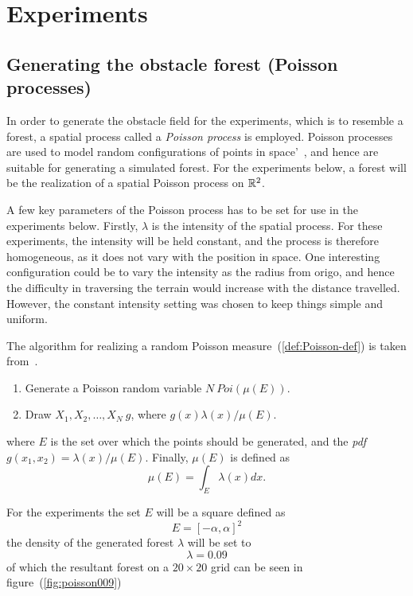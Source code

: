 \chapter{Experiments}

\section{Generating the obstacle forest (Poisson processes)}
\label{sec:Poisson-Process}

In order to generate the obstacle field for the experiments, which is to
resemble a forest, a spatial process called a \textit{Poisson process} is
employed. Poisson processes are used to model random configurations of points in
space'~\cite{kroeseSpatialProcessGeneration}, and hence are suitable for
generating a simulated forest. For the experiments below, a forest will be the
realization of a spatial Poisson process on \(\mathbb{R}^2\).

A few key parameters of the Poisson process has to be set for use in the
experiments below. Firstly, \(\lambda\) is the intensity of the spatial process.
For these experiments, the intensity will be held constant, and the process is
therefore homogeneous, as it does not vary with the position in space. One
interesting configuration could be to vary the intensity as the radius from
origo, and hence the difficulty in traversing the terrain would increase with
the distance travelled. However, the constant intensity setting was chosen to
keep things simple and uniform.

The algorithm for realizing a random Poisson measure~(\ref{def:Poisson-def}) is
taken from~\cite[Definition 1.1.1,p~34]{kroeseSpatialProcessGeneration}.

\begin{definition}
  \label{def:Poisson-def}
  \begin{enumerate}
  \item Generate a Poisson random variable \(N ~ Poi(\mu(E))\).
  \item Draw \(X_1,X_2,\ldots,X_N ~ g\), where \(g(x) \lambda(x)/ \mu(E)\).
  \end{enumerate}
\end{definition}
where \(E\) is the set over which the points should be generated, and the
\textit{pdf} \(g(x_1, x_2) = \lambda(x)/\mu(E)\). Finally, \(\mu(E)\) is defined
as
\[
  \mu(E) = \int_{E} \lambda(x) dx.
\]

For the experiments the set \(E\) will be a square defined as
\[
  E = [-\alpha, \alpha]^2
\]
the density of the generated forest \(\lambda\) will be set to
\[
  \lambda = 0.09
\]
of which the resultant forest on a \(20 \times 20\) grid can be seen in
figure~(\ref{fig:poisson009})

